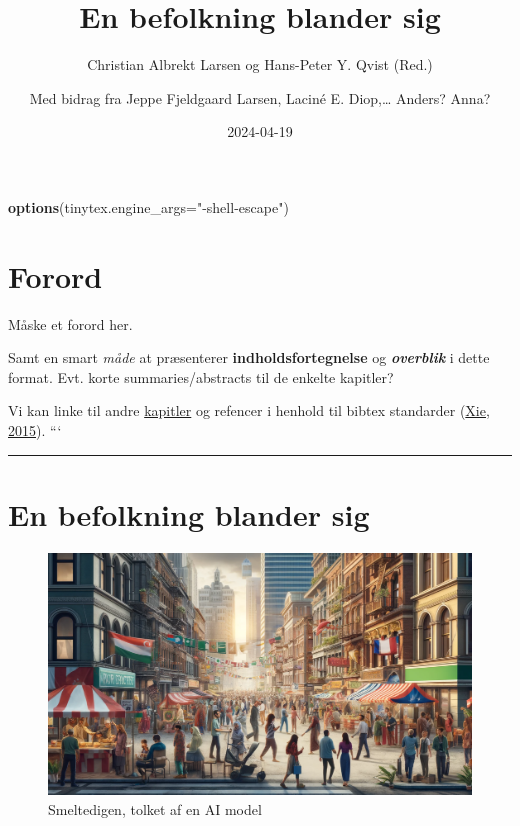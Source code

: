 \documentclass[
]{book}
\title{En befolkning blander sig}
\author{Christian Albrekt Larsen og Hans-Peter Y. Qvist (Red.) \and Med bidrag fra Jeppe Fjeldgaard Larsen, Laciné E. Diop,\ldots{} Anders? Anna?}
\date{2024-04-19}
\newenvironment{Shaded}{\begin{snugshade}}{\end{snugshade}}
\newcommand{\AttributeTok}[1]{\textcolor[rgb]{0.13,0.29,0.53}{#1}}
\newcommand{\FunctionTok}[1]{\textcolor[rgb]{0.13,0.29,0.53}{\textbf{#1}}}
\newcommand{\NormalTok}[1]{#1}
\newcommand{\StringTok}[1]{\textcolor[rgb]{0.31,0.60,0.02}{#1}}
\begin{document}
\maketitle

{
\setcounter{tocdepth}{1}
\tableofcontents
}
\begin{Shaded}
\begin{Highlighting}[]
\FunctionTok{options}\NormalTok{(}\AttributeTok{tinytex.engine\_args=}\StringTok{"{-}shell{-}escape"}\NormalTok{)}
\end{Highlighting}
\end{Shaded}

\hypertarget{forord}{%
\chapter*{Forord}\label{forord}}

Måske et forord her.

Samt en smart \emph{måde} at præsenterer \textbf{indholdsfortegnelse} og \textbf{\emph{overblik}} i dette format. Evt. korte summaries/abstracts til de enkelte kapitler?

Vi kan linke til andre \protect\hyperlink{kap1}{kapitler} og refencer i henhold til bibtex standarder (\protect\hyperlink{ref-xie2015}{Xie, 2015}).
```

\begin{center}\rule{0.5\linewidth}{0.5pt}\end{center}

\hypertarget{kap1}{%
\chapter{En befolkning blander sig}\label{kap1}}

\begin{figure}
\includegraphics[width=24.89in]{images/dalle-smeltedige} \caption{Smeltedigen, tolket af en AI model}\label{fig:fig-smelte}
\end{figure}
\end{document}
